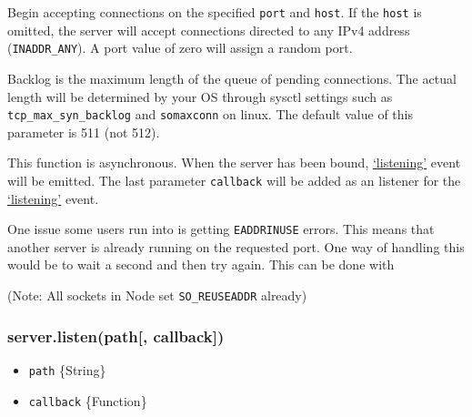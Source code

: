Begin accepting connections on the specified \texttt{port} and
\texttt{host}. If the \texttt{host} is omitted, the server will accept
connections directed to any IPv4 address (\texttt{INADDR\_ANY}). A port
value of zero will assign a random port.

Backlog is the maximum length of the queue of pending connections. The
actual length will be determined by your OS through sysctl settings such
as \texttt{tcp\_max\_syn\_backlog} and \texttt{somaxconn} on linux. The
default value of this parameter is 511 (not 512).

This function is asynchronous. When the server has been bound,
\hyperref[netux5feventux5flistening]{`listening'} event will be emitted.
The last parameter \texttt{callback} will be added as an listener for
the \hyperref[netux5feventux5flistening]{`listening'} event.

One issue some users run into is getting \texttt{EADDRINUSE} errors.
This means that another server is already running on the requested port.
One way of handling this would be to wait a second and then try again.
This can be done with

\begin{Shaded}
\begin{Highlighting}[]
\NormalTok{(}\NormalTok{, } 
   \NormalTok{(} \NormalTok{== }\NormalTok{) \{}
    \NormalTok{(}\NormalTok{);}
    \NormalTok{(} \NormalTok{() \{}
      \NormalTok{();}
    \NormalTok{\}, }\NormalTok{);}
  \NormalTok{\}}
\NormalTok{\});}
\end{Highlighting}
\end{Shaded}

(Note: All sockets in Node set \texttt{SO\_REUSEADDR} already)

\subsubsection{server.listen(path{[},
callback{]})}\label{server.listenpath-callback}

\begin{itemize}
\itemsep1pt\parskip0pt
\item
  \texttt{path} \{String\}
\item
  \texttt{callback} \{Function\}
\end{itemize}

